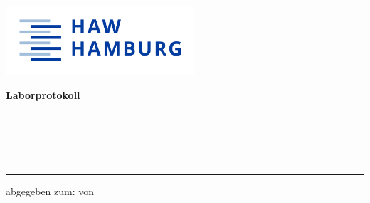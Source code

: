 
\makeatletter
\begin{titlepage}
    {\sffamily
    \color{haw}
    \raggedright
    \hfill\includegraphics[width=7cm]{src/HAW_Marke_RGB_300dpi.jpg}\\
  
    \vspace{5cm}
  
    \small
    \textbf{Laborprotokoll}
  
    \vspace{5mm}
  
    \begin{minipage}{0.8\linewidth}
      \LARGE
      \textbf{\@title\\[1mm]}
      \Large
      \textbf{\@subtitle\\[1mm]}
      
      \,\rule{11mm}{1.2mm}
    \end{minipage}
  
    \vspace{1cm}
  
    abgegeben zum: \abgabetermin{} von\\
    \@author
  
}
\end{titlepage}
